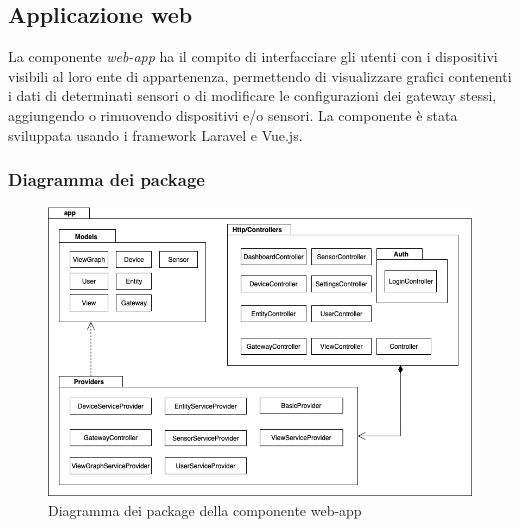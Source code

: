 \subsection{Applicazione web}
La componente \textit{web-app} ha il compito di interfacciare gli utenti con i dispositivi visibili al loro ente di appartenenza, permettendo di visualizzare grafici contenenti i dati di determinati sensori o di modificare le configurazioni dei gateway stessi, aggiungendo o rimuovendo dispositivi e/o sensori. 
La componente è stata sviluppata usando i framework Laravel e Vue.js.

	\subsubsection{Diagramma dei package}%
		\begin{figure}[H]
			\centering
			\includegraphics[scale=0.600]{res/images/WEBAPP/WebAppPackage.png}
			\caption{Diagramma dei package della componente web-app}
			\label{Diagramma 21}
		\end{figure}

